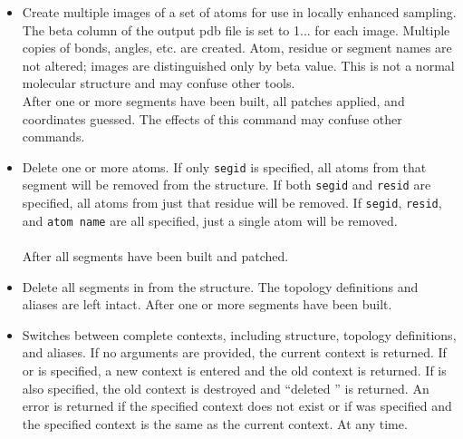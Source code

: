 \begin{itemize}
\item {}
{Create multiple images of a set of atoms for use in locally enhanced sampling.  The beta column of the output pdb file is set to 1... for each image.  Multiple copies of bonds, angles, etc. are created.  Atom, residue or segment names are not altered; images are distinguished only by beta value.  This is not a normal molecular structure and may confuse other tools.}
{\\
}
{After one or more segments have been built, all patches applied, and coordinates guessed.  The effects of this command may confuse other commands.}

\item {}
{Delete one or more atoms.  If only {\tt segid} is specified, all atoms from
that segment will be removed from the structure.  If both {\tt segid} and
{\tt resid} are specified, all atoms from just that residue will be removed.
If {\tt segid}, {\tt resid}, and {\tt atom name} are all specified, just a
single atom will be removed.}
{\\
\\
}
{After all segments have been built and patched.}

\item {}
{Delete all segments in from the structure.  The topology definitions and 
aliases are left intact.}
{}
{After one or more segments have been built.}

\item {}
{Switches between complete contexts, including structure, topology definitions,
and aliases.  If no arguments are provided, the current context is returned.
If  or  is specified, a new context is entered and
the old context is returned.  If  is also specified, the old
context is destroyed and ``deleted '' is returned.  An error is
returned if the specified context does not exist or if  was
specified and the specified context is the same as the current context.}
{}
{At any time.}


\end{itemize}
